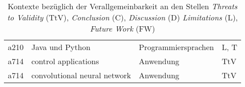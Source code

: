 \begin{table}[h!]
\begin{tabular}{ r | l | l | l }
        a210 & Java und Python & Programmiersprachen & L, T \\
        a714 & control applications & Anwendung & TtV \\
        a714 & convolutional neural network & Anwendung & TtV \\
    \end{tabular}
    \caption{Kontexte bezüglich der Verallgemeinbarkeit
    an den Stellen \textit{Threats to Validity} (TtV), \textit{Conclusion} (C), \textit{Discussion} (D)
    \textit{Limitations} (L), \textit{Future Work} (FW)
    }
    \label{table:kontexte-verallgemeinbarkeit}
\end{table}
